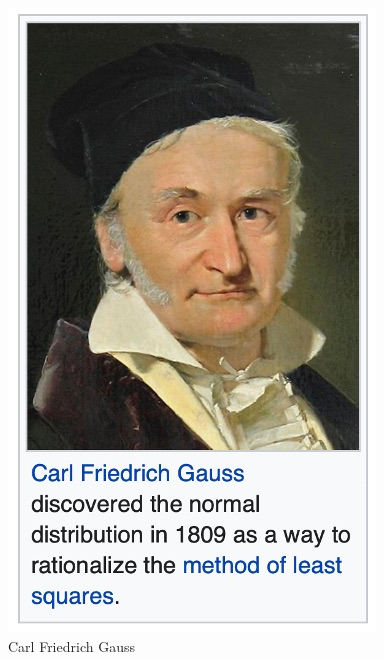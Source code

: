 \documentclass[
  12 pt,
  a4paper,
]{book}
\numberwithin{equation}{section}
\theoremstyle{plain}      %
\theoremstyle{definition} %
\theoremstyle{remark}     %
\theoremstyle{note}         %
\begin{document}
\begin{figure}[H]
    \begin{minipage}[t]{0.40\textwidth}
        \vspace{-38em} %
        \centering
        \includegraphics[width=\textwidth, height=0.3\textheight]{pictures/gauss.jpeg}
        \caption{Carl Friedrich Gauss}
        \vspace{1em} %

\end{minipage}
\end{figure}
\end{document}
